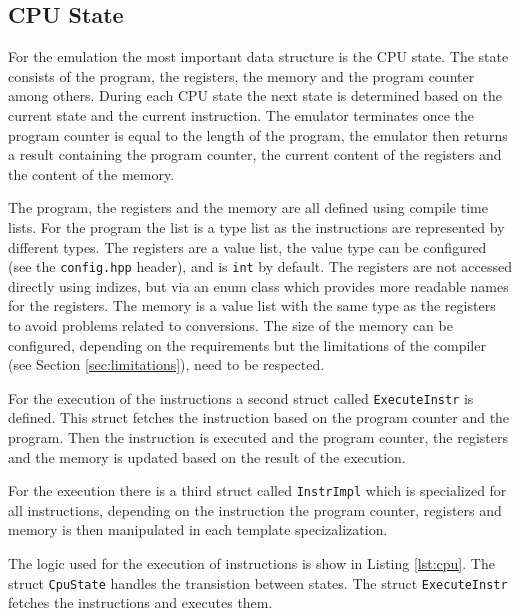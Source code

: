 
\subsection{CPU State}
For the emulation the most important data structure is the CPU state. The state consists of the program, the registers,
the memory and the program counter among others. During each CPU state the next state is determined based on the 
current state and the current instruction.
The emulator terminates once the program counter is equal to the length of the program,
the emulator then returns a result containing the program counter, the current content
of the registers and the content of the memory.

The program, the registers and the memory are all defined using  compile time lists.
For the program the list is a type list as the instructions are represented by different
types. The registers are a value list, the value type can be configured (see the
\texttt{config.hpp} header), and is \lstinline{int} by default. The registers are not
accessed directly using indizes, but via an enum class which provides
more readable names for the registers. The memory is a value list with the same type
as the registers to avoid problems related to conversions. The size of the memory
can be configured, depending on the requirements but the limitations of the compiler 
(see Section \ref{sec:limitations}), need to be respected.

For the execution of the instructions a second struct called \lstinline{ExecuteInstr} is defined. 
This struct fetches the instruction based on the program counter and the program. Then
the instruction is executed and the program counter, the registers and the memory is
updated based on the result of the execution.

For the execution there is a third struct called \lstinline{InstrImpl} which is
specialized for all instructions, depending on the instruction the program counter,
registers and memory is then manipulated in each template specizalization.

The logic used for the execution of instructions is show in Listing \ref{lst:cpu}.
The struct \lstinline{CpuState} handles the transistion between states. The struct
\lstinline{ExecuteInstr} fetches the instructions and executes them.







